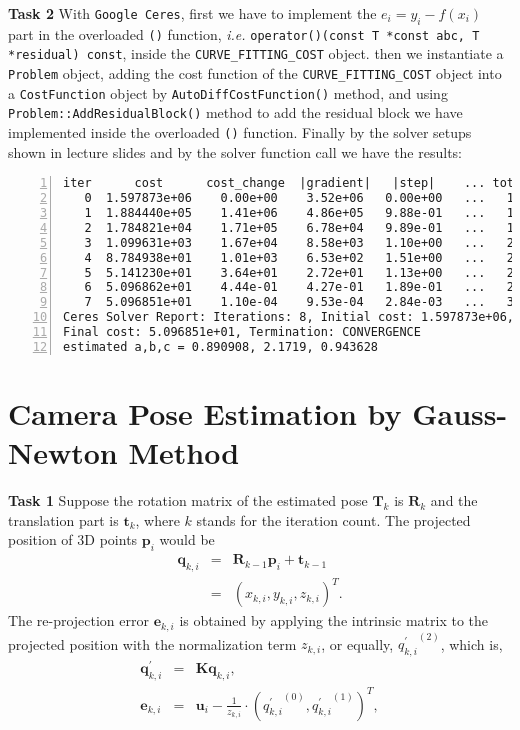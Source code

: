 \documentclass[12pt,a4paper]{article}
\newcommand{\vct}[1]{\boldsymbol{#1}}
\newcommand{\mtx}[1]{\mathbf{#1}}
\begin{document}
    \textsf{\textbf{Task 2}}
    With \texttt{Google Ceres},
    first we have to implement the $e_i = y_i - f(x_i)$ part in
    the overloaded \texttt{()} function, \emph{i.e.}
    \texttt{operator()(const T *const abc, T *residual) const},
    inside the \texttt{CURVE\_FITTING\_COST} object.
    then we instantiate a \texttt{Problem} object,
    adding the cost function of the \texttt{CURVE\_FITTING\_COST} object
    into a \texttt{CostFunction} object
    by \texttt{AutoDiffCostFunction()} method,
    and using \texttt{Problem::AddResidualBlock()} method
    to add the residual block we have implemented inside
    the overloaded \texttt{()} function.
    Finally by the solver setups shown in lecture slides 
    and by the solver function call 
    we have the results:
    \begin{lstlisting}[frame=single,numbers=left]
iter      cost      cost_change  |gradient|   |step|    ... total_time
   0  1.597873e+06    0.00e+00    3.52e+06   0.00e+00   ...   1.17e-02
   1  1.884440e+05    1.41e+06    4.86e+05   9.88e-01   ...   1.66e-02
   2  1.784821e+04    1.71e+05    6.78e+04   9.89e-01   ...   1.99e-02
   3  1.099631e+03    1.67e+04    8.58e+03   1.10e+00   ...   2.29e-02
   4  8.784938e+01    1.01e+03    6.53e+02   1.51e+00   ...   2.58e-02
   5  5.141230e+01    3.64e+01    2.72e+01   1.13e+00   ...   2.79e-02
   6  5.096862e+01    4.44e-01    4.27e-01   1.89e-01   ...   2.98e-02
   7  5.096851e+01    1.10e-04    9.53e-04   2.84e-03   ...   3.17e-02
Ceres Solver Report: Iterations: 8, Initial cost: 1.597873e+06, 
Final cost: 5.096851e+01, Termination: CONVERGENCE
estimated a,b,c = 0.890908, 2.1719, 0.943628
    \end{lstlisting}

    \section{Camera Pose Estimation by Gauss-Newton Method}
    \textsf{\textbf{Task 1}}
    Suppose the rotation matrix of 
    the estimated pose $\mtx{T}_k$ is $\mtx{R}_k$
    and the translation part is $\vct{t}_k$,
    where $k$ stands for the iteration count.
    The projected position of 3D points $\vct{p}_i$ would be
    \begin{eqnarray}\label{eq:proj_pos}
      \vct{q}_{k,i} &=& \mtx{R}_{k-1} \vct{p}_i + \vct{t}_{k-1} \nonumber \\
      &=& (x_{k,i}, y_{k,i}, z_{k,i})^T.
    \end{eqnarray}
    The re-projection error $\vct{e}_{k,i}$ is obtained
    by applying the intrinsic matrix to the projected position
    with the normalization term $z_{k,i}$, or equally, ${q^{'}_{k,i}}^{(2)}$,
    which is,
    \begin{eqnarray}
      \vct{q}^{'}_{k,i} &=& \mtx{K}\vct{q}_{k,i}, \nonumber \\
      \vct{e}_{k,i} &=& \vct{u}_i -
        \frac{1}{ z_{k,i}} \cdot ({q^{'}_{k,i}}^{(0)}, {q^{'}_{k,i}}^{(1)})^T,
    \end{eqnarray}
\end{document}

